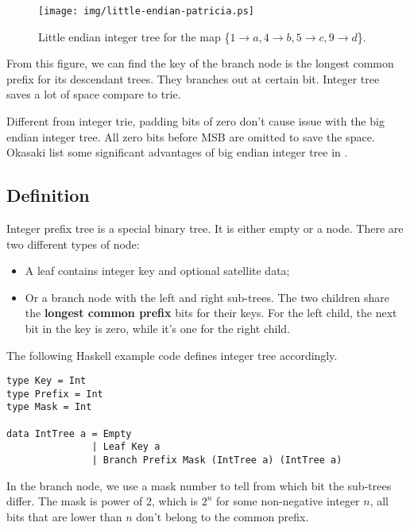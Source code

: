 \documentclass{article}
\begin{document}
\begin{figure}[htbp]
  \centering
  \texttt{[image: img/little-endian-patricia.ps]}
  \caption{Little endian integer tree for the map
     \{$ 1 \rightarrow a, 4 \rightarrow b, 5 \rightarrow c, 9 \rightarrow d$\}.}
  \label{fig:little-endian-patricia}
\end{figure}

From this figure, we can find the key of the branch node is the
longest common prefix for its descendant trees.
They branches out at certain bit. Integer tree saves a lot of space compare
to trie.

Different from integer trie, padding bits of zero don't cause issue
with the big endian integer tree. All zero bits before MSB are omitted to
save the space. Okasaki list some significant advantages of big endian
integer tree in \cite{okasaki-int-map}.

\subsection{Definition}

Integer prefix tree is a special binary tree. It is either
empty or a node. There are two different types of node:

\begin{itemize}
\item A leaf contains integer key and optional satellite data;
\item Or a branch node with the left and right sub-trees. The
two children share the \textbf{longest common prefix} bits for their keys.
For the left child, the next bit in the key is zero, while it's one
for the right child.
\end{itemize}

The following Haskell example code defines integer tree accordingly.

\lstset{language=Haskell}
\begin{lstlisting}
type Key = Int
type Prefix = Int
type Mask = Int

data IntTree a = Empty
               | Leaf Key a
               | Branch Prefix Mask (IntTree a) (IntTree a)
\end{lstlisting}

In the branch node, we use a mask number to tell from which bit the sub-trees differ.
The mask is power of 2, which is $2^n$ for some non-negative integer $n$, all
bits that are lower than $n$ don't belong to the common prefix.
\end{document}
